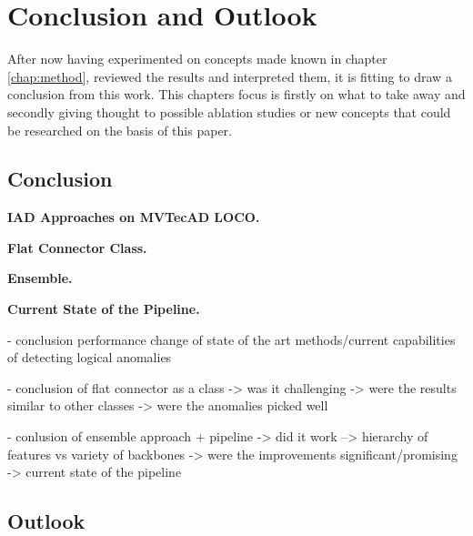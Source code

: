 \chapter{Conclusion and Outlook}
\label{chap:conclusion}


After now having experimented on concepts made known in chapter \ref{chap:method}, reviewed the results and interpreted them, it is 
fitting to draw a conclusion from this work. This chapters focus is firstly on what to take away and secondly giving thought to 
possible ablation studies or new concepts that could be researched on the basis of this paper.


\section{Conclusion}
\label{sec:realconclusion}

\textbf{IAD Approaches on MVTecAD LOCO.}

\textbf{Flat Connector Class.}

\textbf{Ensemble.}

\textbf{Current State of the Pipeline.}

- conclusion performance change of state of the art methods/current capabilities of detecting logical anomalies\newline

- conclusion of flat connector as a class\newline
-> was it challenging\newline
-> were the results similar to other classes\newline
-> were the anomalies picked well%

- conlusion of ensemble approach + pipeline\newline
-> did it work\newline
--> hierarchy of features vs variety of backbones\newline
-> were the improvements significant/promising\newline
-> current state of the pipeline\newline




\section{Outlook}
\label{sec:finaloutlook}

